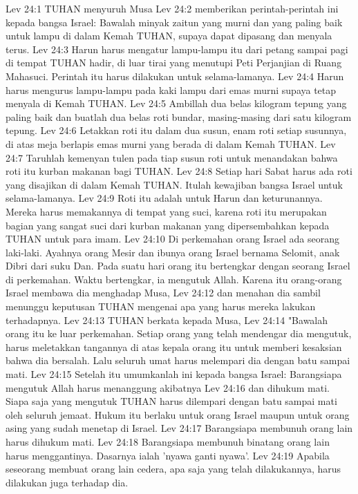 Lev 24:1  TUHAN menyuruh Musa
Lev 24:2  memberikan perintah-perintah ini kepada bangsa Israel: Bawalah minyak zaitun yang murni dan yang paling baik untuk lampu di dalam Kemah TUHAN, supaya dapat dipasang dan menyala terus.
Lev 24:3  Harun harus mengatur lampu-lampu itu dari petang sampai pagi di tempat TUHAN hadir, di luar tirai yang menutupi Peti Perjanjian di Ruang Mahasuci. Perintah itu harus dilakukan untuk selama-lamanya.
Lev 24:4  Harun harus mengurus lampu-lampu pada kaki lampu dari emas murni supaya tetap menyala di Kemah TUHAN.
Lev 24:5  Ambillah dua belas kilogram tepung yang paling baik dan buatlah dua belas roti bundar, masing-masing dari satu kilogram tepung.
Lev 24:6  Letakkan roti itu dalam dua susun, enam roti setiap susunnya, di atas meja berlapis emas murni yang berada di dalam Kemah TUHAN.
Lev 24:7  Taruhlah kemenyan tulen pada tiap susun roti untuk menandakan bahwa roti itu kurban makanan bagi TUHAN.
Lev 24:8  Setiap hari Sabat harus ada roti yang disajikan di dalam Kemah TUHAN. Itulah kewajiban bangsa Israel untuk selama-lamanya.
Lev 24:9  Roti itu adalah untuk Harun dan keturunannya. Mereka harus memakannya di tempat yang suci, karena roti itu merupakan bagian yang sangat suci dari kurban makanan yang dipersembahkan kepada TUHAN untuk para imam.
Lev 24:10  Di perkemahan orang Israel ada seorang laki-laki. Ayahnya orang Mesir dan ibunya orang Israel bernama Selomit, anak Dibri dari suku Dan. Pada suatu hari orang itu bertengkar dengan seorang Israel di perkemahan. Waktu bertengkar, ia mengutuk Allah. Karena itu orang-orang Israel membawa dia menghadap Musa,
Lev 24:12  dan menahan dia sambil menunggu keputusan TUHAN mengenai apa yang harus mereka lakukan terhadapnya.
Lev 24:13  TUHAN berkata kepada Musa,
Lev 24:14  "Bawalah orang itu ke luar perkemahan. Setiap orang yang telah mendengar dia mengutuk, harus meletakkan tangannya di atas kepala orang itu untuk memberi kesaksian bahwa dia bersalah. Lalu seluruh umat harus melempari dia dengan batu sampai mati.
Lev 24:15  Setelah itu umumkanlah ini kepada bangsa Israel: Barangsiapa mengutuk Allah harus menanggung akibatnya
Lev 24:16  dan dihukum mati. Siapa saja yang mengutuk TUHAN harus dilempari dengan batu sampai mati oleh seluruh jemaat. Hukum itu berlaku untuk orang Israel maupun untuk orang asing yang sudah menetap di Israel.
Lev 24:17  Barangsiapa membunuh orang lain harus dihukum mati.
Lev 24:18  Barangsiapa membunuh binatang orang lain harus menggantinya. Dasarnya ialah 'nyawa ganti nyawa'.
Lev 24:19  Apabila seseorang membuat orang lain cedera, apa saja yang telah dilakukannya, harus dilakukan juga terhadap dia.
